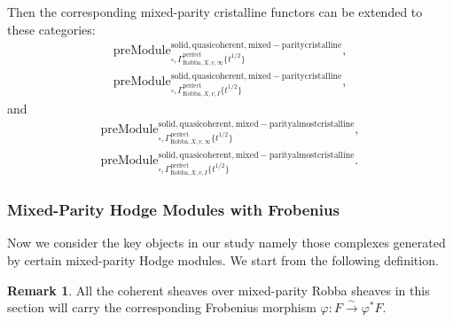 \documentclass[12pt]{book}
\theoremstyle{definition}
\newtheorem{remark}{Remark}
\begin{document}
\indent Then the corresponding mixed-parity cristalline functors can be extended to these categories:
\begin{align}
\mathrm{preModule}^\mathrm{solid,quasicoherent,mixed-paritycristalline}_{\square,\Gamma^\mathrm{perfect}_{\text{Robba},X,v,\infty}\{t^{1/2}\}},\\
\mathrm{preModule}^\mathrm{solid,quasicoherent,mixed-paritycristalline}_{\square,\Gamma^\mathrm{perfect}_{\text{Robba},X,v,I}\{t^{1/2}\}}, 
\end{align}
and
\begin{align}
\mathrm{preModule}^\mathrm{solid,quasicoherent,mixed-parityalmostcristalline}_{\square,\Gamma^\mathrm{perfect}_{\text{Robba},X,v,\infty}\{t^{1/2}\}},\\
\mathrm{preModule}^\mathrm{solid,quasicoherent,mixed-parityalmostcristalline}_{\square,\Gamma^\mathrm{perfect}_{\text{Robba},X,v,I}\{t^{1/2}\}}. 
\end{align}



\subsubsection{Mixed-Parity Hodge Modules with Frobenius}


\noindent Now we consider the key objects in our study namely those complexes generated by certain mixed-parity Hodge modules. We start from the following definition.

\begin{remark}
All the coherent sheaves over mixed-parity Robba sheaves in this section will carry the corresponding Frobenius morphism $\varphi: F \overset{\sim}{\longrightarrow} \varphi^*F$.
\end{remark}
\end{document}
